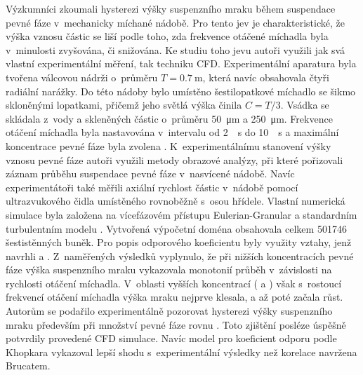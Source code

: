 Výzkumníci \citet{sar10} zkoumali hysterezi výšky suspenzního mra\-ku během suspendace pevné fáze v~mechanicky míchané nádobě. Pro tento jev je charakteristické, že výška vznosu částic se liší podle toho, zda frekvence otáčené míchadla byla v~minulosti zvyšována, či snižována. Ke studiu toho jevu autoři využili jak svá vlastní experimentální měření, tak techniku CFD. Experimentální aparatura byla tvo\-ře\-na válcovou nádrži o~průměru $T=\SI{0.7}{\meter}$, která navíc obsahovala čtyři radiální narážky. Do této nádoby bylo umístěno šestilopatkové míchadlo se šikmo skloněnými lopatkami, přičemž jeho světlá výška činila $C=T/3$. Vsádka se skládala z~vody a skleněných částic o~průměru \SI{50}{\micro\meter} a \SI{250}{\micro\meter}. Frekvence otáčení míchadla byla nastavována v~intervalu od \SI{2}{\per\second} do \SI{10}{\per\second} a maximální koncentrace pevné fáze byla zvolena . K~experimentálnímu stanovení výšky vznosu pevné fáze autoři využili metody obrazové analýzy, při které pořizovali záznam průběhu suspendace pevné fáze v~nasvícené nádobě. Navíc experimentátoři také měřili axiální rychlost částic v~nádobě pomocí ultrazvukového čidla umístěného rovnoběžně s~osou hřídele. Vlastní numerická simulace byla založena na vícefázovém přístupu Eulerian-Granular a standardním turbulentním modelu \keps{}. Vytvořená výpočetní doména obsahovala celkem \num{501746} šestistěnných buněk. Pro popis odporového koeficientu byly využity vztahy, jenž navrhli \citet{bru98} a \citet{kho06}. Z~naměřených výsledků vyplynulo, že při nižších koncentracích pevné fáze výška suspenzního mraku vykazovala monotonií průběh v~závislosti na rychlosti otáčení míchadla. V~oblasti vyšších koncentrací ( a ) však s~rostoucí frekvencí otáčení míchadla výška mraku nejprve klesala, a až poté začala růst. Autorům se podařilo experimentálně pozorovat hysterezi výšky suspenzního mraku především při množství pevné fáze rovnu . Toto zjištění posléze úspěšně potvrdily provedené CFD simulace. Navíc model pro koeficient odporu podle Khopkara vykazoval lepší shodu s~experimentální výsledky než korelace navržena Brucatem.


